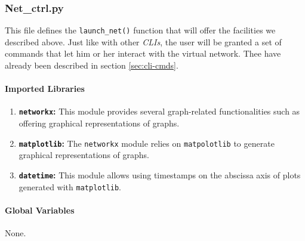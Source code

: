 \subsubsection{Net\_ctrl.py}
    This file defines the \texttt{launch\_net()} function that will offer the facilities we described above. Just like with other \textit{CLIs}, the user will be granted a set of commands that let him or her interact with the virtual network. Thee have already been described in section \ref{sec:cli-cmds}.\\

    \paragraph{Imported Libraries}
        \begin{enumerate}
            \item \textbf{\texttt{networkx}:} This module provides several graph-related functionalities such as offering graphical representations of graphs.
            \item \textbf{\texttt{matplotlib}:} The \texttt{networkx} module relies on \texttt{matpolotlib} to generate graphical representations of graphs.
            \item \textbf{\texttt{datetime}:} This module allows using timestamps on the abscissa axis of plots generated with \texttt{matplotlib}.
        \end{enumerate}

    \paragraph{Global Variables}
        None.

